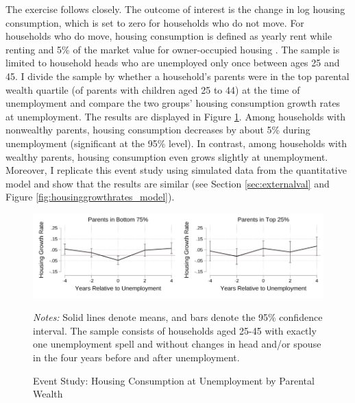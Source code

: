 \documentclass[12pt]{article}
\begin{document}
The exercise follows \cite{Chetty2007} closely. The outcome of interest is the change in log housing consumption, which is set to zero for households who do not move. For households who do move, housing consumption is defined as yearly rent while renting and 5\% of the market value for owner-occupied housing \citep{Davis2008}. The sample is limited to household heads who are unemployed only once between ages 25 and 45. I divide the sample by whether a household's parents were in the top parental wealth quartile (of parents with children aged 25 to 44) at the time of unemployment and compare the two groups' housing consumption growth rates at unemployment. The results are displayed in Figure \ref{fig:housinggrowthrates}. Among households with nonwealthy parents, housing consumption decreases by about 5\% during unemployment (significant at the 95\% level). In contrast, among households with wealthy parents, housing consumption even grows slightly at unemployment. Moreover, I replicate this event study using simulated data from the quantitative model and show that the results are similar (see Section \ref{sec:externalval} and Figure \ref{fig:housinggrowthrates_model}).
\begin{figure}
	\caption{Event Study: Housing Consumption at Unemployment by Parental Wealth}\label{fig:housinggrowthrates}
	\noindent\includegraphics[width=0.5\textwidth]{../tabfig/descr/PSID_housinggrowthpoor_both}\includegraphics[width=0.5\textwidth]{../tabfig/descr/PSID_housinggrowthrich_both}

	{\begin{footnotesize} \textit{Notes:} Solid lines denote means, and bars denote the 95\% confidence interval. The sample consists of households aged 25-45 with exactly one unemployment spell and without changes in head and/or spouse in the four years before and after unemployment. \end{footnotesize}}
\end{figure}
\end{document}
